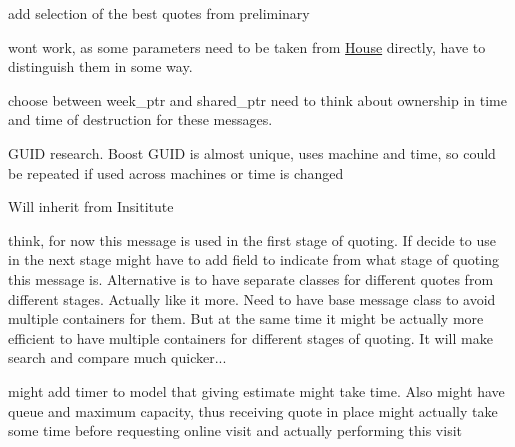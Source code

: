 \begin{DoxyRefList}
add selection of the best quotes from preliminary  
\item[\label{_dev_stage1__DevStage1000001}%
\hypertarget{_dev_stage1__DevStage1000001}{}%
Member \hyperlink{classsolar__core_1_1_household_a008a18ff8c2d15da72e19876dc896a4e}{solar\+\_\+core\+:\+:Household\+:\+:get\+\_\+inf\+\_\+online\+\_\+quote} (\hyperlink{classsolar__core_1_1_i_agent}{I\+Agent} $\ast$agent\+\_\+to)]won\textquotesingle{}t work, as some parameters need to be taken from \hyperlink{classsolar__core_1_1_house}{House} directly, have to distinguish them in some way.  
\item[\label{_dev_stage1__DevStage1000004}%
\hypertarget{_dev_stage1__DevStage1000004}{}%
Member \hyperlink{classsolar__core_1_1_household_a297842358a2d79db160566106972bc0d}{solar\+\_\+core\+:\+:Household\+:\+:preliminary\+\_\+quotes} ]choose between week\+\_\+ptr and shared\+\_\+ptr need to think about ownership in time and time of destruction for these messages.  
\item[\label{_dev_stage1__DevStage1000005}%
\hypertarget{_dev_stage1__DevStage1000005}{}%
Member \hyperlink{classsolar__core_1_1_household_a733a90456d57f698b3aa974c6c6e0108}{solar\+\_\+core\+:\+:Household\+:\+:update\+\_\+params} ()]G\+U\+I\+D research. Boost G\+U\+I\+D is almost unique, uses machine and time, so could be repeated if used across machines or time is changed  
\item[\label{_dev_stage1__DevStage1000008}%
\hypertarget{_dev_stage1__DevStage1000008}{}%
Class \hyperlink{classsolar__core_1_1_marketing_inst}{solar\+\_\+core\+:\+:Marketing\+Inst} ]Will inherit from Insititute 
\item[\label{_dev_stage1__DevStage1000007}%
\hypertarget{_dev_stage1__DevStage1000007}{}%
Class \hyperlink{classsolar__core_1_1_mes_marketing_s_e_i_preliminary_quote}{solar\+\_\+core\+:\+:Mes\+Marketing\+S\+E\+I\+Preliminary\+Quote} ]think, for now this message is used in the first stage of quoting. If decide to use in the next stage might have to add field to indicate from what stage of quoting this message is. Alternative is to have separate classes for different quotes from different stages. Actually like it more. Need to have base message class to avoid multiple containers for them. But at the same time it might be actually more efficient to have multiple containers for different stages of quoting. It will make search and compare much quicker... 
\item[\label{_dev_stage1__DevStage1000006}%
\hypertarget{_dev_stage1__DevStage1000006}{}%
Class \hyperlink{classsolar__core_1_1_s_e_i}{solar\+\_\+core\+:\+:S\+E\+I} ]might add timer to model that giving estimate might take time. Also might have queue and maximum capacity, thus receiving quote in place might actually take some time before requesting online visit and actually performing this visit 

\end{DoxyRefList}
